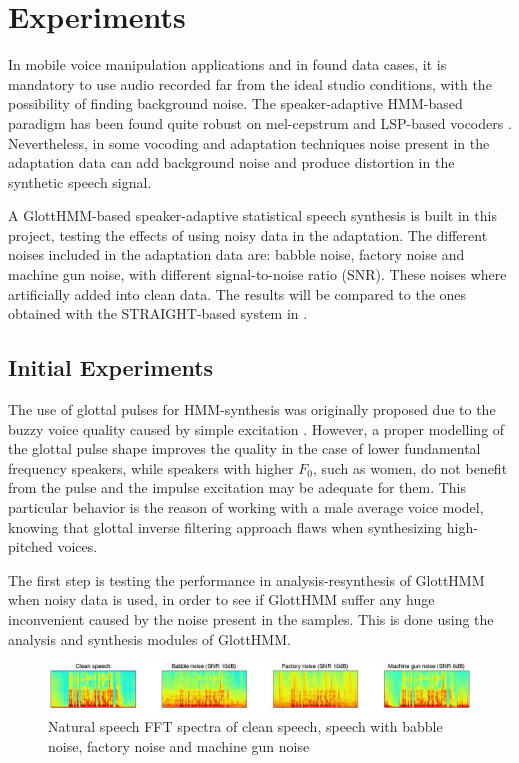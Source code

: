 \section{Experiments}
\label{experiments}
In mobile voice manipulation applications and in found data cases, it is mandatory to use audio recorded far from the ideal studio conditions, with the possibility of finding background noise.
%
The speaker-adaptive HMM-based paradigm has been found quite robust on mel-cepstrum \cite{karhila_jstsp_14, yamagishi2008robustness} and LSP-based vocoders \cite{yanagisawa2013noise}.
%
Nevertheless, in some vocoding and adaptation techniques noise present in the adaptation data can add background noise and produce distortion in the synthetic speech signal.

A GlottHMM-based speaker-adaptive statistical speech synthesis is built in this project, testing the effects of using noisy data in the adaptation.
%
The different noises included in the adaptation data are: babble noise, factory noise and machine gun noise, with different signal-to-noise ratio (SNR).
%
These noises where artificially added into clean data.
%
The results will be compared to the ones obtained with the STRAIGHT-based system in \cite{karhila_jstsp_14}.

\subsection{Initial Experiments}
\label{experiments_initial}
The use of glottal pulses for HMM-synthesis was originally proposed due to the buzzy voice quality caused by simple excitation \cite{raitio2008hmm}.
%
However, a proper modelling of the glottal pulse shape improves the quality in the case of lower fundamental frequency speakers, while speakers with higher $F_{0}$, such as women, do not benefit from the pulse and the impulse excitation may be adequate for them.
%
This particular behavior is the reason of working with a male average voice model, knowing that glottal inverse filtering approach flaws when synthesizing high-pitched voices.

The first step is testing the performance in analysis-resynthesis of GlottHMM when noisy data is used, in order to see if GlottHMM suffer any huge inconvenient caused by the noise present in the samples. This is done using the analysis and synthesis modules of GlottHMM.

\begin{figure}[!htb]
\begin{centering}
\includegraphics[width=\textwidth]{images/natural_spectra.jpg}
\caption{Natural speech FFT spectra of clean speech, speech with babble noise, factory noise and machine gun noise}
\label{fig:natural_spectra}
\end{centering}
\end{figure}

